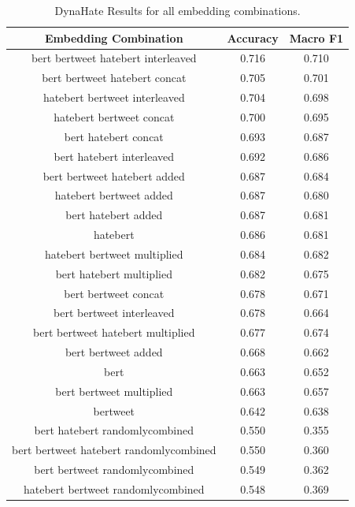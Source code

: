 \documentclass{article} %
\begin{document}
\begin{table}[htbp]
\begin{center}
    \begin{tabular}{|c|c|c|}
    \hline
    Embedding Combination & Accuracy & Macro F1\\
    \hline \hline
    bert bertweet hatebert interleaved       &     0.716 &     0.710 \\ \hline
    bert bertweet hatebert concat            &     0.705 &     0.701 \\ \hline
    hatebert bertweet interleaved            &     0.704 &     0.698 \\ \hline
    hatebert bertweet concat                 &     0.700 &     0.695 \\ \hline
    bert hatebert concat                     &     0.693 &     0.687 \\ \hline
    bert hatebert interleaved                &     0.692 &     0.686 \\ \hline
    bert bertweet hatebert added             &     0.687 &     0.684 \\ \hline
    hatebert bertweet added                  &     0.687 &     0.680 \\ \hline
    bert hatebert added                      &     0.687 &     0.681 \\ \hline
    hatebert                                 &     0.686 &     0.681 \\ \hline
    hatebert bertweet multiplied             &     0.684 &     0.682 \\ \hline
    bert hatebert multiplied                 &     0.682 &     0.675 \\ \hline
    bert bertweet concat                     &     0.678 &     0.671 \\ \hline
    bert bertweet interleaved                &     0.678 &     0.664 \\ \hline
    bert bertweet hatebert multiplied        &     0.677 &     0.674 \\ \hline
    bert bertweet added                      &     0.668 &     0.662 \\ \hline
    bert                                     &     0.663 &     0.652 \\ \hline
    bert bertweet multiplied                 &     0.663 &     0.657 \\ \hline
    bertweet                                 &     0.642 &     0.638 \\ \hline
    bert hatebert randomlycombined           &     0.550 &     0.355 \\ \hline
    bert bertweet hatebert randomlycombined  &     0.550 &     0.360 \\ \hline
    bert bertweet randomlycombined           &     0.549 &     0.362 \\ \hline
    hatebert bertweet randomlycombined       &     0.548 &     0.369 \\ \hline
    \end{tabular}
    \caption{DynaHate Results for all embedding combinations.}
    \label{resultsTable:dynahate-full-results}
\end{center}
\end{table}
\end{document}
